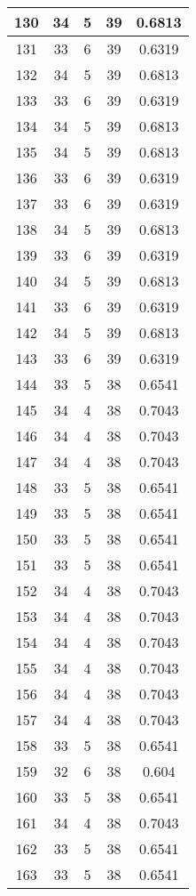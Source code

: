 \documentclass[letterpaper, 12pt]{article}
\begin{document}
\begin{longtable}{|c|c|c|c|c|}
\hline
130 & 34 & 5 & 39 & 0.6813 \\
\hline
131 & 33 & 6 & 39 & 0.6319 \\
\hline
132 & 34 & 5 & 39 & 0.6813 \\
\hline
133 & 33 & 6 & 39 & 0.6319 \\
\hline
134 & 34 & 5 & 39 & 0.6813 \\
\hline
135 & 34 & 5 & 39 & 0.6813 \\
\hline
136 & 33 & 6 & 39 & 0.6319 \\
\hline
137 & 33 & 6 & 39 & 0.6319 \\
\hline
138 & 34 & 5 & 39 & 0.6813 \\
\hline
139 & 33 & 6 & 39 & 0.6319 \\
\hline
140 & 34 & 5 & 39 & 0.6813 \\
\hline
141 & 33 & 6 & 39 & 0.6319 \\
\hline
142 & 34 & 5 & 39 & 0.6813 \\
\hline
143 & 33 & 6 & 39 & 0.6319 \\
\hline
144 & 33 & 5 & 38 & 0.6541 \\
\hline
145 & 34 & 4 & 38 & 0.7043 \\
\hline
146 & 34 & 4 & 38 & 0.7043 \\
\hline
147 & 34 & 4 & 38 & 0.7043 \\
\hline
148 & 33 & 5 & 38 & 0.6541 \\
\hline
149 & 33 & 5 & 38 & 0.6541 \\
\hline
150 & 33 & 5 & 38 & 0.6541 \\
\hline
151 & 33 & 5 & 38 & 0.6541 \\
\hline
152 & 34 & 4 & 38 & 0.7043 \\
\hline
153 & 34 & 4 & 38 & 0.7043 \\
\hline
154 & 34 & 4 & 38 & 0.7043 \\
\hline
155 & 34 & 4 & 38 & 0.7043 \\
\hline
156 & 34 & 4 & 38 & 0.7043 \\
\hline
157 & 34 & 4 & 38 & 0.7043 \\
\hline
158 & 33 & 5 & 38 & 0.6541 \\
\hline
159 & 32 & 6 & 38 & 0.604 \\
\hline
160 & 33 & 5 & 38 & 0.6541 \\
\hline
161 & 34 & 4 & 38 & 0.7043 \\
\hline
162 & 33 & 5 & 38 & 0.6541 \\
\hline
163 & 33 & 5 & 38 & 0.6541 \\

\end{longtable}
\end{document}
